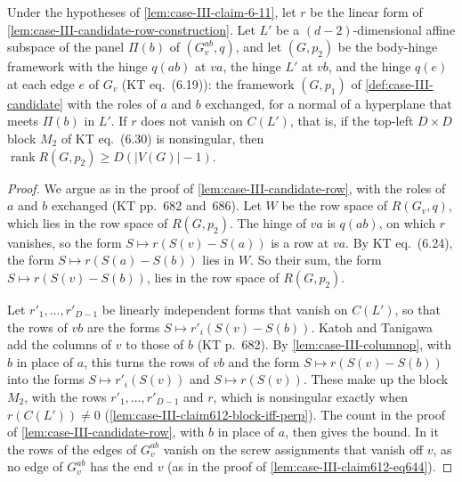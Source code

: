 \begin{lemma}
  \label{lem:case-III-claim612-p2-placement}
  \leanok
  Under the hypotheses of \cref{lem:case-III-claim-6-11}, let $r$ be the
  linear form of \cref{lem:case-III-candidate-row-construction}. Let $L'$
  be a $(d-2)$-dimensional affine subspace of the panel $\Pi(b)$ of
  $(G_v^{ab}, q)$, and let $(G, p_2)$ be the body-hinge framework with
  the hinge $q(ab)$ at $va$, the hinge $L'$ at $vb$, and the hinge $q(e)$
  at each edge $e$ of $G_v$ (KT eq.~(6.19)): the framework $(G, p_1)$ of
  \cref{def:case-III-candidate} with the roles of $a$ and $b$ exchanged,
  for a normal of a hyperplane that meets $\Pi(b)$ in $L'$. If $r$ does
  not vanish on $C(L')$, that is, if the top-left $D \times D$ block
  $M_2$ of KT eq.~(6.30) is nonsingular, then
  $\operatorname{rank} R(G, p_2) \ge D(|V(G)| - 1)$.
\end{lemma}
\begin{proof}
  \leanok
  We argue as in the proof of \cref{lem:case-III-candidate-row}, with
  the roles of $a$ and $b$ exchanged (KT pp.~682 and~686). Let $W$ be the
  row space of $R(G_v, q)$, which lies in the row space of $R(G, p_2)$.
  The hinge of $va$ is $q(ab)$, on which $r$ vanishes, so the form
  $S \mapsto r(S(v) - S(a))$ is a row at $va$. By KT eq.~(6.24), the
  form $S \mapsto r(S(a) - S(b))$ lies in $W$. So their sum, the form
  $S \mapsto r(S(v) - S(b))$, lies in the row space of $R(G, p_2)$.

  Let $r'_1, \dots, r'_{D-1}$ be linearly independent forms that vanish
  on $C(L')$, so that the rows of $vb$ are the forms
  $S \mapsto r'_i(S(v) - S(b))$. Katoh and Tanigawa add the columns of
  $v$ to those of $b$ (KT p.~682). By \cref{lem:case-III-columnop}, with
  $b$ in place of $a$, this turns the rows of $vb$ and the form
  $S \mapsto r(S(v) - S(b))$ into the forms $S \mapsto r'_i(S(v))$ and
  $S \mapsto r(S(v))$. These make up the block $M_2$, with the rows
  $r'_1, \dots, r'_{D-1}$ and $r$, which is nonsingular exactly when
  $r(C(L')) \neq 0$ (\cref{lem:case-III-claim612-block-iff-perp}). The
  count in the proof of \cref{lem:case-III-candidate-row}, with $b$ in
  place of $a$, then gives the bound. In it the rows of the edges of
  $G_v^{ab}$ vanish on the screw assignments that vanish off $v$, as no
  edge of $G_v^{ab}$ has the end $v$ (as in the proof of
  \cref{lem:case-III-claim612-eq644}).
\end{proof}

